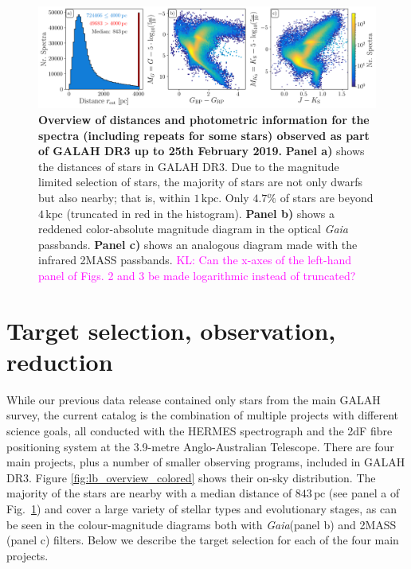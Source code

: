 \documentclass[fleqn,usenatbib,useAMS]{mnras}
\newcommand{\Gaia}{\textit{Gaia}\xspace}
\newcommand\KL[1]{\textcolor{magenta}{KL: #1}}
\begin{document}
\begin{figure}
\centering
\includegraphics[width=\textwidth]{figures/plot_parallax_quality_and_cmds.png}
\caption{
\textbf{Overview of distances and photometric information for the spectra (including repeats for some stars) observed as part of GALAH DR3 up to 25th February 2019.}
\textbf{Panel a)} shows the distances of stars in GALAH DR3. Due to the magnitude limited selection of stars, the majority of stars are not only dwarfs but also nearby; that is, within $1\,\mathrm{kpc}$. Only $4.7\%$ of stars are beyond $4\,\mathrm{kpc}$ (truncated in red in the histogram). 
\textbf{Panel b)} shows a reddened color-absolute magnitude diagram in the optical \Gaia passbands.
\textbf{Panel c)} shows an analogous diagram made with the infrared 2MASS passbands.
\KL{Can the x-axes of the left-hand panel of Figs. 2 and 3 be made logarithmic instead of truncated?}
}
\label{fig:plot_parallax_quality_and_cmds}
\end{figure}

\section{Target selection, observation, reduction} \label{sec:selection_observation_reduction}

While our previous data release \citep{Buder2018} contained only stars from the main GALAH survey, the current catalog is the combination of multiple projects with different science goals, all conducted with the HERMES spectrograph \citep{Sheinis2015} and the 2dF fibre positioning system \citep{Lewis2002} at the 3.9-metre Anglo-Australian Telescope. There are four main projects, plus a number of smaller observing programs, included in GALAH DR3. Figure \ref{fig:lb_overview_colored} shows their on-sky distribution. The majority of the stars are nearby with a median distance of $843\,\mathrm{pc}$ (see panel a of Fig.~\ref{fig:plot_parallax_quality_and_cmds}) and cover a large variety of stellar types and evolutionary stages, as can be seen in the colour-magnitude diagrams both with \Gaia (panel b) and 2MASS (panel c) filters. Below we describe the target selection for each of the four main projects.
\end{document}
